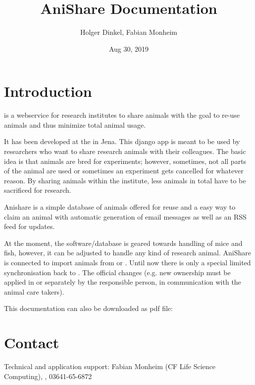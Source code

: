 \documentclass[letterpaper,10pt,openany,oneside,english]{sphinxmanual}
\title{AniShare Documentation}
\date{Aug 30, 2019}
\author{Holger Dinkel, Fabian Monheim}
\begin{document}
\pagestyle{empty}
\sphinxmaketitle
\pagestyle{plain}
\sphinxtableofcontents
\pagestyle{normal}
\label{\detokenize{index::doc}}



\chapter{Introduction}
\label{\detokenize{index:introduction}}
 is a webservice for research institutes to share animals with the goal to re-use
animals and thus minimize total animal usage.

It has been developed at the  in
Jena. This django app is meant to be used by researchers who want to share research animals with
their colleagues. The basic idea is that animals are bred for experiments; however, sometimes, not
all parts of the animal are used or sometimes an experiment gets cancelled for whatever reason. By
sharing animals within the institute, less animals in total have to be sacrificed for research.

Anishare is a simple database of animals offered for reuse and a easy way to claim an animal with
automatic generation of email messages as well as an RSS feed for updates.

\noindent{}

At the moment, the software/database is geared towards handling of mice and fish, however, it can be adjusted
to handle any kind of research animal. AniShare is connected to import animals from  or . Until now there is only a special limited synchronisation back to .
The official changes (e.g. new ownership must be applied in  or  separately by the responsible person, in communication with the animal care takers).

This documentation can also be downloaded as pdf file: 


\chapter{Contact}
\label{\detokenize{index:contact}}
Technical and application support: Fabian Monheim (CF Life Science Computing), , 03641-65-6872
\end{document}
